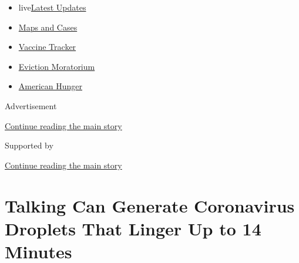 \begin{itemize}
\tightlist
\item
  live\href{https://www.nytimes3xbfgragh.onion/2020/09/08/world/covid-19-coronavirus.html?name=styln-coronavirus-national\&region=TOP_BANNER\&block=storyline_menu_recirc\&action=click\&pgtype=Article\&impression_id=50fe31c1-f1cc-11ea-96a6-ef6e07581fac\&variant=undefined}{Latest
  Updates}
\item
  \href{https://www.nytimes3xbfgragh.onion/interactive/2020/us/coronavirus-us-cases.html?name=styln-coronavirus-national\&region=TOP_BANNER\&block=storyline_menu_recirc\&action=click\&pgtype=Article\&impression_id=50fe58d0-f1cc-11ea-96a6-ef6e07581fac\&variant=undefined}{Maps
  and Cases}
\item
  \href{https://www.nytimes3xbfgragh.onion/interactive/2020/science/coronavirus-vaccine-tracker.html?name=styln-coronavirus-national\&region=TOP_BANNER\&block=storyline_menu_recirc\&action=click\&pgtype=Article\&impression_id=50fe58d1-f1cc-11ea-96a6-ef6e07581fac\&variant=undefined}{Vaccine
  Tracker}
\item
  \href{https://www.nytimes3xbfgragh.onion/2020/09/02/your-money/eviction-moratorium-covid.html?name=styln-coronavirus-national\&region=TOP_BANNER\&block=storyline_menu_recirc\&action=click\&pgtype=Article\&impression_id=50fe58d2-f1cc-11ea-96a6-ef6e07581fac\&variant=undefined}{Eviction
  Moratorium}
\item
  \href{https://www.nytimes3xbfgragh.onion/interactive/2020/09/02/magazine/food-insecurity-hunger-us.html?name=styln-coronavirus-national\&region=TOP_BANNER\&block=storyline_menu_recirc\&action=click\&pgtype=Article\&impression_id=50fe58d3-f1cc-11ea-96a6-ef6e07581fac\&variant=undefined}{American
  Hunger}
\end{itemize}

Advertisement

\protect\hyperlink{after-top}{Continue reading the main story}

Supported by

\protect\hyperlink{after-sponsor}{Continue reading the main story}

\hypertarget{talking-can-generate-coronavirus-droplets-that-linger-up-to-14-minutes}{%
\section{Talking Can Generate Coronavirus Droplets That Linger Up to 14
Minutes}\label{talking-can-generate-coronavirus-droplets-that-linger-up-to-14-minutes}}

